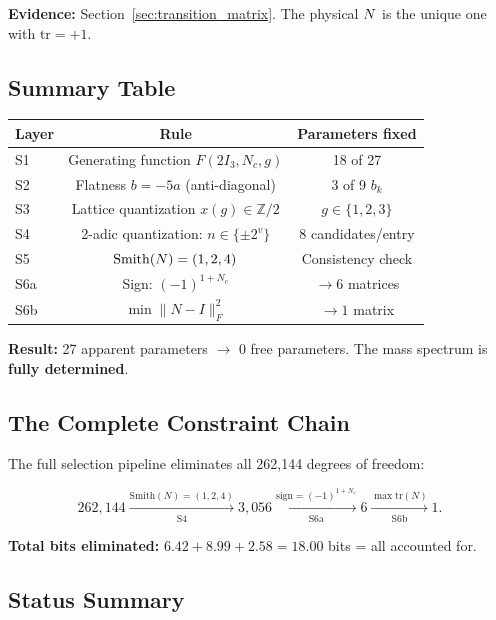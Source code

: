 \textbf{Evidence:} Section~\ref{sec:transition_matrix}. The physical $N$ is the unique one with $\mathrm{tr} = +1$.

\subsection{Summary Table}\label{app:selection_summary}

\begin{center}
\label{tab:selection_summary}
\begin{tabular}{lcc}
\hline\hline
Layer & Rule & Parameters fixed \\
\hline
S1 & Generating function $F(2I_3, N_c, g)$ & 18 of 27 \\
S2 & Flatness $b = -5a$ (anti-diagonal) & 3 of 9 $b_k$ \\
S3 & Lattice quantization $x(g) \in \mathbb{Z}/2$ & $g \in \{1, 2, 3\}$ \\
S4 & 2-adic quantization: $n \in \{\pm 2^v\}$ & 8 candidates/entry \\
S5 & $\mathrm{Smith}(N) = (1, 2, 4)$ & Consistency check \\
S6a & Sign: $(-1)^{1+N_c}$ & $\to 6$ matrices \\
S6b & $\min\|N - I\|_F^2$ & $\to 1$ matrix \\
\hline\hline
\end{tabular}
\end{center}

\textbf{Result:} 27 apparent parameters $\to$ 0 free parameters. The mass spectrum is \textbf{fully determined}.

\subsection{The Complete Constraint Chain}\label{app:constraint_chain}

The full selection pipeline eliminates all 262,144 degrees of freedom:

\begin{equation}
262{,}144 \xrightarrow[\mathrm{S4}]{\mathrm{Smith}(N)=(1,2,4)} 3{,}056 \xrightarrow[\mathrm{S6a}]{\mathrm{sign}=(-1)^{1+N_c}} 6 \xrightarrow[\mathrm{S6b}]{\max\mathrm{tr}(N)} 1.
\end{equation}

\textbf{Total bits eliminated:} $6.42 + 8.99 + 2.58 = 18.00$ bits = all accounted for.

\subsection{Status Summary}\label{app:status_summary}

